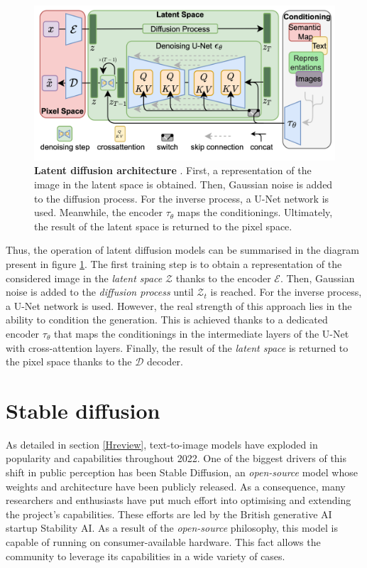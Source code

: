 \begin{figure}
    \centering
    \includegraphics[width=1\textwidth]{Pictures/LDMDiagram.png} 
    \caption{\textbf{Latent diffusion architecture} \cite{rombach2022high}. First, a representation of the image in the latent space is obtained. Then, Gaussian noise is added to the diffusion process. For the inverse process, a U-Net network is used. Meanwhile, the encoder $\tau_\theta$ maps the conditionings. Ultimately, the result of the latent space is returned to the pixel space.}
    \label{fig:LDMDiagram}
\end{figure}

Thus, the operation of latent diffusion models can be summarised in the diagram present in figure \ref{fig:LDMDiagram}. The first training step is to obtain a representation of the considered image in the \textit{latent space} $\mathcal{Z}$ thanks to the encoder  $\mathcal{E}$. Then, Gaussian noise is added to the \textit{diffusion process} until $\mathcal{Z}_t$ is reached. For the inverse process, a U-Net network is used. However, the real strength of this approach lies in the ability to condition the generation. This is achieved thanks to a dedicated encoder $\tau_\theta$ that maps the conditionings in the intermediate layers of the U-Net with cross-attention layers. Finally, the result of the \textit{latent space} is returned to the pixel space thanks to the $\mathcal{D}$ decoder.

\section{Stable diffusion} \label{SD}

As detailed in section \ref{Hreview}, text-to-image models have exploded in popularity and capabilities throughout 2022. One of the biggest drivers of this shift in public perception has been Stable Diffusion, an \textit{open-source} model whose weights and architecture have been publicly released. As a consequence, many researchers and enthusiasts have put much effort into optimising and extending the project's capabilities. These efforts are led by the British generative AI startup Stability AI. As a result of the \textit{open-source} philosophy, this model is capable of running on consumer-available hardware. This fact allows the community to leverage its capabilities in a wide variety of cases.

